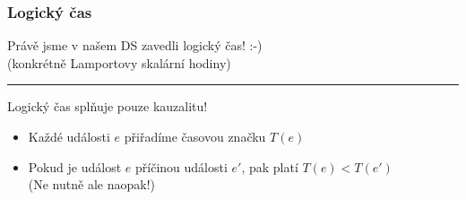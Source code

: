 \documentclass[usenames,dvipsnames,9pt]{beamer}
\begin{document}
\begin{frame}
\begin{center}
  \end{center}
\end{frame}

\begin{frame}
  \frametitle{Logický čas}

  \begin{center}
  	{\LARGE Právě jsme v našem DS zavedli logický čas! :-)} \\
  	(konkrétně Lamportovy skalární hodiny)
  \end{center}

  \pause\vspace{1em}\hrule\vspace{1em}

  Logický čas splňuje pouze kauzalitu!
  \begin{itemize}
  	\item Každé události $e$ přiřadíme časovou značku $T(e)$
  	\item Pokud je událost $e$ příčinou události $e'$, pak platí $T(e) < T(e')$ \\
		{\small (Ne nutně ale naopak!)}
  \end{itemize}
\end{frame}
\end{document}
